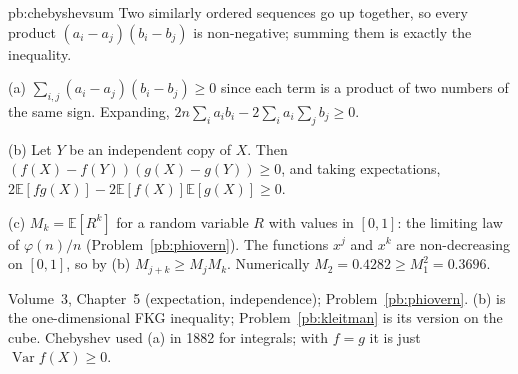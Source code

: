 \begin{solution}{pb:chebyshevsum}
\idea Two similarly ordered sequences go up together, so every product $(a_i-a_j)(b_i-b_j)$ is non-negative; summing them is exactly the
inequality.

\writeup (a) $\sum_{i,j}(a_i-a_j)(b_i-b_j)\ge0$ since each term is a product of two numbers of the same sign. Expanding,
$2n\sum_ia_ib_i-2\sum_ia_i\sum_jb_j\ge0$.

(b) Let $Y$ be an independent copy of $X$. Then $(f(X)-f(Y))(g(X)-g(Y))\ge0$, and taking expectations,
$2\mathbb E[fg(X)]-2\mathbb E[f(X)]\mathbb E[g(X)]\ge0$.

(c) $M_k=\mathbb E[R^k]$ for a random variable $R$ with values in $[0,1]$: the limiting law of $\varphi(n)/n$ (Problem~\ref{pb:phiovern}). The functions
$x^j$ and $x^k$ are non-decreasing on $[0,1]$, so by (b) $M_{j+k}\ge M_jM_k$. Numerically $M_2=0.4282\ge M_1^2=0.3696$.

\tools Volume~3, Chapter~5 (expectation, independence); Problem~\ref{pb:phiovern}.
\leads (b) is the one-dimensional FKG inequality; Problem~\ref{pb:kleitman} is its version on the cube. Chebyshev used (a) in
1882 for integrals; with $f=g$ it is just $\operatorname{Var}f(X)\ge0$.
\end{solution}

